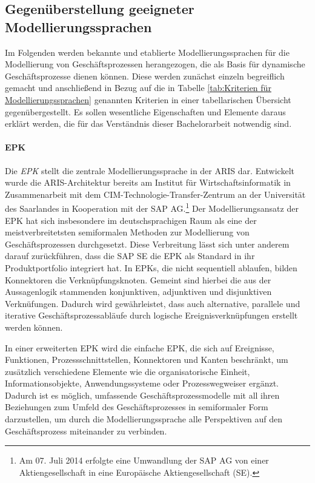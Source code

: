 \subsection{Gegenüberstellung geeigneter Modellierungssprachen}
Im Folgenden werden bekannte und etablierte Modellierungssprachen für die Modellierung von Geschäftsprozessen herangezogen, die als Basis für dynamische Geschäftsprozesse dienen können. 
Diese werden zunächst einzeln begreiflich gemacht und anschließend in Bezug auf die in Tabelle \ref{tab:Kriterien für Modellierungssprachen} genannten Kriterien in einer tabellarischen Übersicht gegenübergestellt. 
Es sollen wesentliche Eigenschaften und Elemente daraus erklärt werden, die für das Verständnis dieser Bachelorarbeit notwendig sind.

\paragraph{\acl{EPK}}
Die \textit{\acf{EPK}} stellt die zentrale Modellierungssprache in der \acf{ARIS} dar.
Entwickelt wurde die \ac{ARIS}-Architektur bereits \citeyear{Scheer.1991} am Institut für Wirtschaftsinformatik in Zusammenarbeit mit dem \ac{CIM}-Technologie-Transfer-Zentrum an der Universität des Saarlandes in Kooperation mit der SAP AG.\footnote{Am 07. Juli 2014 erfolgte eine Umwandlung der SAP AG von einer Aktiengesellschaft in eine Europäische Aktiengesellschaft (SE).}
\cite{Scheer.1991}
Der Modellierungsansatz der \ac{EPK} hat sich insbesondere im deutschsprachigen Raum als eine der meistverbreitetsten semiformalen Methoden zur Modellierung von Geschäftsprozessen durchgesetzt. 
\cite{Gadatsch.2013}
Diese Verbreitung lässt sich unter anderem darauf zurückführen, dass die SAP SE die \ac{EPK} als Standard in ihr Produktportfolio integriert hat. 
\cite{Staud.2006}
In \ac{EPK}s, die nicht sequentiell ablaufen, bilden Konnektoren die Verknüpfungsknoten. Gemeint sind hierbei die aus der Aussagenlogik stammenden konjunktiven, adjunktiven und disjunktiven Verknüfungen. Dadurch wird gewährleistet, dass auch alternative, parallele und iterative Geschäftsprozessabläufe durch logische Ereignisverknüpfungen erstellt werden können.
\cite{Lehmann.2008}

In einer erweiterten \ac{EPK} wird die einfache \ac{EPK}, die sich auf Ereignisse, Funktionen, Prozessschnittstellen, Konnektoren und Kanten beschränkt, um zusätzlich verschiedene Elemente wie die organisatorische Einheit, Informationsobjekte, Anwendungssysteme oder Prozesswegweiser ergänzt. 
\cite{Seidlmeier.2015}
Dadurch ist es möglich, umfassende Geschäftsprozessmodelle mit all ihren Beziehungen zum Umfeld des Geschäftsprozesses in semiformaler Form darzustellen, um durch die Modellierungssprache alle Perspektiven auf den Geschäftsprozess miteinander zu verbinden.
\cite{Gadatsch.2013}

